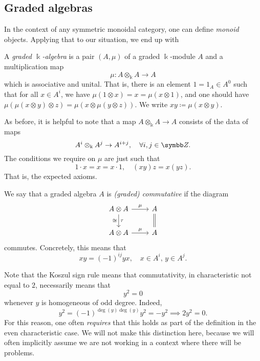 \subsection{Graded algebras}
In the context of any symmetric monoidal category, one can define \emph{monoid} objects. Applying that to our situation, we end up with
\begin{definition}
	A \emph{graded \(\Bbbk\)-algebra} is a pair \((A,\mu)\) of a graded \(\Bbbk\)-module \(A\) and a multiplication map
	\[ \mu\!: A\otimes_\Bbbk A\to A \]
	which is associative and unital. That is, there is an element \(1 = 1_A \in A^0\) such that for all \(x\in A^i\), we have \(\mu(1\otimes x) = x = \mu(x\otimes 1)\),
	and one should have \(\mu(\mu(x\otimes y)\otimes z) = \mu(x\otimes\mu(y\otimes z))\). We write \(xy \coloneq \mu(x\otimes y)\).
\end{definition}
\begin{remark}
	As before, it is helpful to note that a map \(A\otimes_\Bbbk A \to A\) consists of the data of maps
	\[ A^i\otimes_\Bbbk A^j \to A^{i+j},\quad \forall i,j\in\Z. \]
	The conditions we require on \(\mu\) are just such that
	\[ 1\cdot x = x = x\cdot 1,\quad (xy)z = x(yz). \]
	That is, the expected axioms.
\end{remark}
\begin{definition}
	We say that a graded algebra \(A\) is \emph{(graded) commutative} if the diagram
	\[
	\begin{tikzcd}
		A\otimes A \ar[r,"\mu"]\ar[d,"\tau","\cong"'] & A \ar[d,equal] \\
		A\otimes A \ar[r,"\mu"] & A
	\end{tikzcd}
	\]
	commutes. Concretely, this means that
	\[ xy = (-1)^{ij}yx,\quad x\in A^i,\, y\in A^j. \]
\end{definition}
\begin{remark}
	Note that the Koszul sign rule means that commutativity, in characteristic not equal to \(2\), necessarily means that
	\[ y^2 = 0 \]
	whenever \(y\) is homogeneous of odd degree. Indeed,
	\[ y^2 = (-1)^{\deg(y)\deg(y)}y^2 = -y^2 \implies 2y^2 = 0. \]
	For this reason, one often \emph{requires} that this holds as part of the definition in the even characteristic case. We will not make
	this distinction here, because we will often implicitly assume we are not working in a context where there will be problems.
\end{remark}

